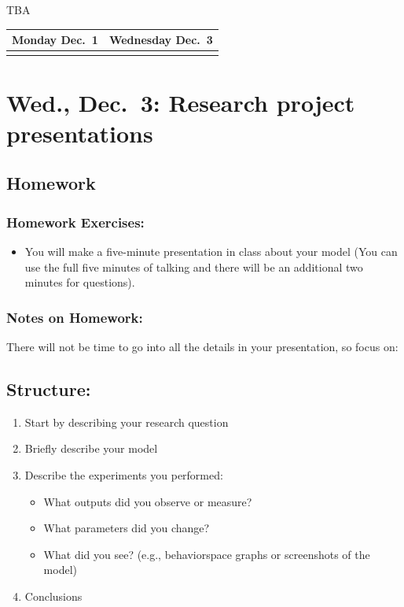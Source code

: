 \documentclass[
]{article}
\providecommand{\tightlist}{%
  \setlength{\itemsep}{0pt}\setlength{\parskip}{0pt}}
\begin{document}
TBA

\begin{longtable}[]{@{}cc@{}}
\toprule\noalign{}
Monday Dec.~1 & Wednesday Dec.~3 \\
\midrule\noalign{}
\endhead
\bottomrule\noalign{}
\endlastfoot
& \\
\end{longtable}

\section{Wed., Dec.~3: Research project
presentations}\label{wed.-dec.-3-research-project-presentations}

\subsection{Homework}\label{homework-14}

\subsubsection{Homework Exercises:}\label{homework-exercises-14}

\begin{itemize}
\tightlist
\item
  You will make a five-minute presentation in class about your model
  (You can use the full five minutes of talking and there will be an
  additional two minutes for questions).
\end{itemize}

\subsubsection{Notes on Homework:}\label{notes-on-homework-10}

There will not be time to go into all the details in your presentation,
so focus on:

\subsection{Structure:}\label{structure-1}

\begin{enumerate}
\tightlist
\item
  Start by describing your research question
\item
  Briefly describe your model
\item
  Describe the experiments you performed:

  \begin{itemize}
  \tightlist
  \item
    What outputs did you observe or measure?
  \item
    What parameters did you change?
  \item
    What did you see? (e.g., behaviorspace graphs or screenshots of the
    model)
  \end{itemize}
\item
  Conclusions
\end{enumerate}
\end{document}
